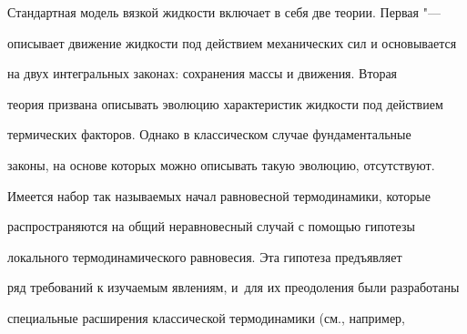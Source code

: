 \date{01/X/2012} %









\maketitle














Стандартная модель вязкой жидкости включает в себя две теории. Первая "--- 

описывает движение жидкости под действием механических сил и основывается

на двух интегральных законах: сохранения массы и движения. Вторая

теория призвана описывать эволюцию характеристик жидкости под действием

термических факторов. Однако в классическом случае фундаментальные

законы, на основе которых можно описывать такую эволюцию, отсутствуют.

Имеется набор так называемых начал равновесной термодинамики, которые

распространяются на общий неравновесный случай с помощью гипотезы

локального термодинамического равновесия. Эта гипотеза предъявляет

ряд требований к изучаемым явлениям, и~для их преодоления были разработаны

специальные расширения классической термодинамики (см., например,

